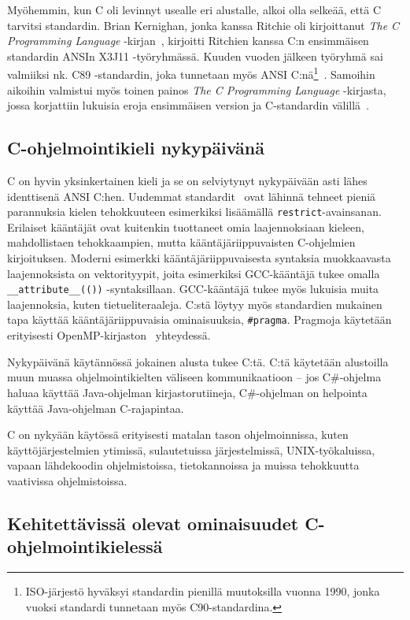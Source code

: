 Myöhemmin, kun C oli levinnyt usealle eri alustalle, alkoi olla selkeää, että C
tarvitsi standardin. Brian Kernighan, jonka kanssa Ritchie oli kirjoittanut
\emph{The C Programming Language} -kirjan~\citep{krfirst}, kirjoitti Ritchien
kanssa C:n ensimmäisen standardin ANSIn X3J11 -työryhmässä. Kuuden vuoden
jälkeen työryhmä sai valmiiksi nk. C89 -standardin, joka tunnetaan myös ANSI
C:nä\footnote{ISO-järjestö hyväksyi standardin pienillä muutoksilla vuonna
1990, jonka vuoksi standardi tunnetaan myös C90-standardina.}~\citep{C89}.
Samoihin aikoihin valmistui myös toinen painos \emph{The C Programming
Language} -kirjasta, jossa korjattiin lukuisia eroja ensimmäisen version ja
C-standardin välillä~\citep{krsecond}.

\subsection{C-ohjelmointikieli nykypäivänä}

C on hyvin yksinkertainen kieli ja se on selviytynyt nykypäivään asti lähes
identtisenä ANSI C:hen. Uudemmat standardit~\citep{C99, C11, C18} ovat lähinnä
tehneet pieniä parannuksia kielen tehokkuuteen esimerkiksi lisäämällä
\texttt{restrict}-avainsanan. Erilaiset kääntäjät ovat kuitenkin tuottaneet
omia laajennoksiaan kieleen, mahdollistaen tehokkaampien, mutta
kääntäjäriippuvaisten C-ohjelmien kirjoituksen. Moderni esimerkki
kääntäjäriippuvaisesta syntaksia muokkaavasta laajennoksista on vektorityypit,
joita esimerkiksi GCC-kääntäjä tukee omalla \texttt{\_\_attribute\_\_(())}
-syntaksillaan. GCC-kääntäjä tukee myös lukuisia muita laajennoksia, kuten
tietueliteraaleja. C:stä löytyy myös standardien mukainen tapa käyttää
kääntäjäriippuvaisia ominaisuuksia, \texttt{\#pragma}. Pragmoja käytetään
erityisesti OpenMP-kirjaston~\citep{openmp} yhteydessä.

Nykypäivänä käytännössä jokainen alusta tukee C:tä. C:tä käytetään alustoilla
muun muassa ohjelmointikielten väliseen kommunikaatioon -- jos C\#-ohjelma
haluaa käyttää Java-ohjelman kirjastorutiineja, C\#-ohjelman on helpointa
käyttää Java-ohjelman C-rajapintaa.

C on nykyään käytössä erityisesti matalan tason ohjelmoinnissa, kuten
käyttöjärjestelmien ytimissä, sulautetuissa järjestelmissä, UNIX-työkaluissa,
vapaan lähdekoodin ohjelmistoissa, tietokannoissa ja muissa tehokkuutta
vaativissa ohjelmistoissa.

\subsection{Kehitettävissä olevat ominaisuudet C-ohjelmointikielessä}

